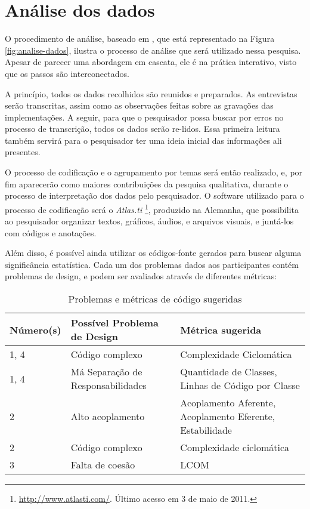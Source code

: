 \section{Análise dos dados}
\label{sec:planejamento-analise}

O procedimento de análise, baseado em \cite{creswell}, que está representado na
Figura \ref{fig:analise-dados}, ilustra o processo de análise que será utilizado
nessa pesquisa. Apesar de parecer uma abordagem em cascata, ele é na prática 
interativo, visto que os passos são interconectados. 

A princípio, todos os dados recolhidos são reunidos e preparados. As entrevistas
serão transcritas, assim como as observações feitas sobre as gravações das implementações.
A seguir, para que o pesquisador possa buscar por erros no processo de transcrição, todos
os dados serão re-lidos. Essa primeira leitura também servirá para o pesquisador ter
uma ideia inicial das informações ali presentes.

O processo de codificação e o agrupamento
por temas será então realizado, e, por fim aparecerão como maiores
contribuições da pesquisa qualitativa, durante o processo de interpretação dos
dados pelo pesquisador. O software utilizado para o processo de codificação será
o \textit{Atlas.ti} \footnote{\url{http://www.atlasti.com/}. Último acesso em 3
de maio de 2011.}, produzido na Alemanha, que possibilita ao pesquisador organizar textos,
gráficos, áudios, e arquivos visuais, e juntá-los com códigos e anotações. 

Além disso, é possível ainda utilizar os códigos-fonte gerados para buscar alguma significância
estatística. Cada um dos problemas dados aos participantes contém problemas de design, e
podem ser avaliados através de diferentes métricas:

\begin{table}[h!]
	\begin{tabular}{ | p{2cm} | p{7cm} | p{6cm} | }
		\hline
		
		Número(s) & Possível Problema de Design & Métrica sugerida \\ \hline
		1, 4 & Código complexo & Complexidade Ciclomática \\ \hline
		1, 4 & Má Separação de Responsabilidades & Quantidade de Classes, Linhas de Código por Classe \\
		
		\hline
		
		2 & Alto acoplamento & Acoplamento Aferente, Acoplamento Eferente, Estabilidade \\ \hline
		2 & Código complexo & Complexidade ciclomática \\
		
		\hline
		
		3 & Falta de coesão & LCOM \\
		
		\hline
		
	\end{tabular}
	\caption{Problemas e métricas de código sugeridas}
\end{table}


